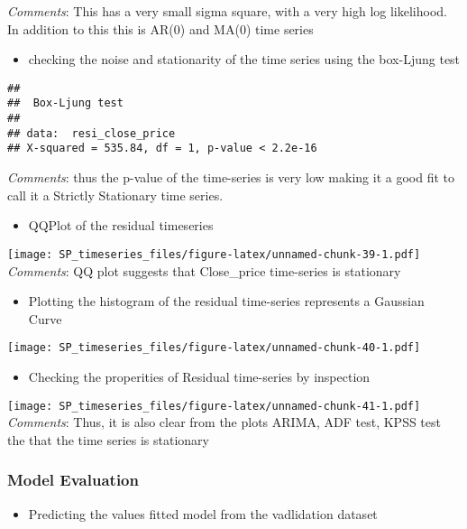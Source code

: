 \documentclass[]{article}
\providecommand{\tightlist}{%
  \setlength{\itemsep}{0pt}\setlength{\parskip}{0pt}}
\begin{document}
\emph{Comments}: This has a very small sigma square, with a very high
log likelihood. In addition to this this is AR(0) and MA(0) time series

\begin{itemize}
\tightlist
\item
  checking the noise and stationarity of the time series using the
  box-Ljung test
\end{itemize}

\begin{verbatim}
## 
##  Box-Ljung test
## 
## data:  resi_close_price
## X-squared = 535.84, df = 1, p-value < 2.2e-16
\end{verbatim}

\emph{Comments}: thus the p-value of the time-series is very low making
it a good fit to call it a Strictly Stationary time series.

\begin{itemize}
\tightlist
\item
  QQPlot of the residual timeseries
\end{itemize}

\texttt{[image: SP\_timeseries\_files/figure-latex/unnamed-chunk-39-1.pdf]}
\emph{Comments}: QQ plot suggests that Close\_price time-series is
stationary

\begin{itemize}
\tightlist
\item
  Plotting the histogram of the residual time-series represents a
  Gaussian Curve
\end{itemize}

\texttt{[image: SP\_timeseries\_files/figure-latex/unnamed-chunk-40-1.pdf]}

\begin{itemize}
\tightlist
\item
  Checking the properities of Residual time-series by inspection
\end{itemize}

\texttt{[image: SP\_timeseries\_files/figure-latex/unnamed-chunk-41-1.pdf]}
\emph{Comments}: Thus, it is also clear from the plots ARIMA, ADF test,
KPSS test the that the time series is stationary

\subsubsection{Model Evaluation}\label{model-evaluation}

\begin{itemize}
\tightlist
\item
  Predicting the values fitted model from the vadlidation dataset
\end{itemize}
\end{document}
